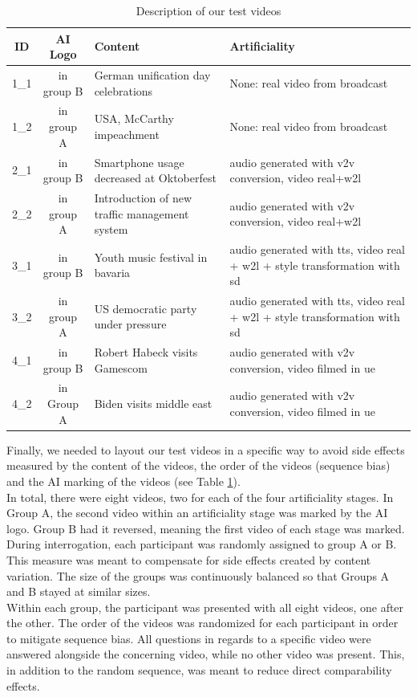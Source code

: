\documentclass[
  a4paper,  %
  twoside,  %
  bibliography=totoc,
  headsepline,
  cleardoublepage=empty,
  parskip=half,
  draft=false
]{scrbook}
\begin{document}
\begin{table}[h]
  \centering
  \begin{tabularx}{\linewidth}{c|c|X|X}
    \textbf{ID} & \textbf{AI Logo} & \textbf{Content} & \textbf{Artificiality}\\
    \midrule
    1\_1 & in group B & German unification day celebrations  & None: real video from broadcast \\
    \midrule
    1\_2 & in group A & USA, McCarthy impeachment  & None: real video from broadcast \\
    \midrule
    2\_1 & in group B & Smartphone usage decreased at Oktoberfest  & audio generated with \gls{v2v} conversion, video real+\gls{w2l} \\
    \midrule
    2\_2 & in group A & Introduction of new traffic management system  & audio generated with \gls{v2v} conversion, video real+\gls{w2l} \\
    \midrule
    3\_1 & in group B & Youth music festival in bavaria  & audio generated with \gls{tts}, video real + \gls{w2l} + style transformation with \gls{sd} \\
    \midrule
    3\_2 & in group A & US democratic party under pressure  & audio generated with \gls{tts}, video real + \gls{w2l} + style transformation with \gls{sd} \\
    \midrule
    4\_1 & in group B & Robert Habeck visits Gamescom  & audio generated with \gls{v2v} conversion, video filmed in \gls{ue} \\
    \midrule
    4\_2 & in Group A & Biden visits middle east  & audio generated with \gls{v2v} conversion, video filmed in \gls{ue} \\
  \end{tabularx}
  \caption{Description of our test videos}
  \label{tab:video-table}
\end{table}
Finally, we needed to layout our test videos in a specific way to avoid side effects measured by the content of the videos, the order of the videos (sequence bias) and the AI marking of the videos (see Table \ref{tab:video-table}). \\

In total, there were eight videos, two for each of the four artificiality stages. In Group A, the second video within an artificiality stage was marked by the AI logo. Group B had it reversed, meaning the first video of each stage was marked. \\
During interrogation, each participant was randomly assigned to group A or B. This measure was meant to compensate for side effects created by content variation. The size of the groups was continuously balanced so that Groups A and B stayed at similar sizes. \\
Within each group, the participant was presented with all eight videos, one after the other. The order of the videos was randomized for each participant in order to mitigate sequence bias. All questions in regards to a specific video were answered alongside the concerning video, while no other video was present. This, in addition to the random sequence, was meant to reduce direct comparability effects.
\end{document}
